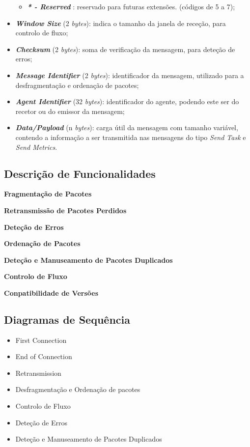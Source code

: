 \documentclass[a4paper,12pt]{scrreprt}
\begin{document}
\begin{itemize}
\begin{itemize}
            \item \textbf{\textit{* - Reserved}}                : reservado para futuras extensões. (códigos de 5 a 7);
        \end{itemize}
    \item \textbf{\textit{Window Size}}        (2 \textit{bytes}): indica o tamanho da janela de receção,
        para controlo de fluxo;
    \item \textbf{\textit{Checksum}}           (2 \textit{bytes}): soma de verificação da mensagem,
        para deteção de erros;
    \item \textbf{\textit{Message Identifier}} (2 \textit{bytes}): identificador da mensagem,
        utilizado para a desfragmentação e ordenação de pacotes;
    \item \textbf{\textit{Agent Identifier}}   (32 \textit{bytes}): identificador do agente,
        podendo este ser do recetor ou do emissor da mensagem;
    \item \textbf{\textit{Data/Payload}}       (n \textit{bytes}): carga útil da mensagem com
        tamanho variável, contendo a informação a ser transmitida nas mensagens do tipo
        \textit{Send Task} e \textit{Send Metrics}.
\end{itemize}

\subsection{Descrição de Funcionalidades}
\label{subsec:nt_desc_funcionalidades}

\textbf{Fragmentação de Pacotes}

\textbf{Retransmissão de Pacotes Perdidos}

\textbf{Deteção de Erros}

\textbf{Ordenação de Pacotes}

\textbf{Deteção e Manuseamento de Pacotes Duplicados}

\textbf{Controlo de Fluxo}

\textbf{Conpatibilidade de Versões}

\subsection{Diagramas de Sequência}

\begin{itemize}
    \item First Connection
    \item End of Connection
    \item Retransmission
    \item Desfragmentação e Ordenação de pacotes
    \item Controlo de Fluxo
    \item Deteção de Erros
    \item Deteção e Manuseamento de Pacotes Duplicados
\end{itemize}
\end{document}

